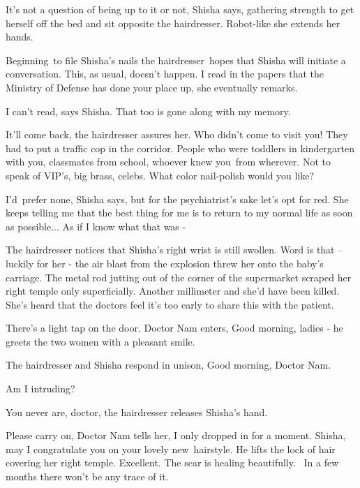 \documentclass[twoside,11pt]{book}
\begin{document}
{\textquotedbl}It's not a question of being up to it or not,{\textquotedbl} Shisha says, gathering strength to get
herself off the bed and sit opposite the hairdresser. Robot-like she extends her hands. 

Beginning~to file Shisha's nails the hairdresser\ hopes that Shisha will initiate a conversation. This, as usual,
doesn't happen. {\textquotedbl}I read in the papers that the Ministry of Defense has done your place up,{\textquotedbl}
she eventually remarks. 

{\textquotedbl}I can't read,{\textquotedbl} says Shisha. {\textquotedbl}That too is gone along with my
memory.{\textquotedbl} 

{\textquotedbl}It'll come back,{\textquotedbl} the hairdresser assures her. {\textquotedbl}Who didn't come to visit you!
They had to put a traffic cop in the corridor. People who were toddlers in kindergarten with you, classmates from
school, whoever knew you\ from wherever. Not to speak of VIP's, big brass, celebs. What color nail-polish would you
like? {\textquotedbl} 

{\textquotedbl}I'd{\ }prefer none,{\textquotedbl} Shisha says,
{\textquotedbl}but for the psychiatrist's sake let's opt for red. She keeps telling me that the best thing for me is to
return to my normal life as soon as possible... As if I know what that was -{\textquotedbl} ~

The hairdresser notices that Shisha's right wrist is still swollen. Word is that -- luckily for her - the air blast from
the explosion threw her onto the baby's carriage. The metal rod jutting out of the corner of the supermarket scraped
her right temple only superficially. Another millimeter and she'd have been killed. She's heard that the doctors feel
it's too early to share this with the patient.

There's a light tap on the door. Doctor Nam enters, {\textquotedbl}Good morning, ladies -{\textquotedbl} he greets the
two women with a pleasant smile.

The hairdresser and Shisha respond in unison, {\textquotedbl}Good morning, Doctor Nam.{\textquotedbl} 

{\textquotedbl}Am I intruding?{\textquotedbl} 

{\textquotedbl}You never are, doctor,{\textquotedbl} the hairdresser releases Shisha's hand. 

{\textquotedbl}Please carry on,{\textquotedbl} Doctor Nam tells her, {\textquotedbl}I only dropped in for a moment.
Shisha, may I congratulate you on your lovely new~hairstyle.{\textquotedbl} He lifts the lock of hair covering her
right temple. {\textquotedbl}Excellent. The scar is healing beautifully. ~In a few months there won't be any trace of
it.{\textquotedbl} 
\end{document}
